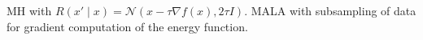 
 MH with $R(x' \mid  x) = \mathcal{N}(x - \tau \nabla f(x), 2\tau I)$.
MALA with subsampling of data for gradient computation of the 
energy function.
